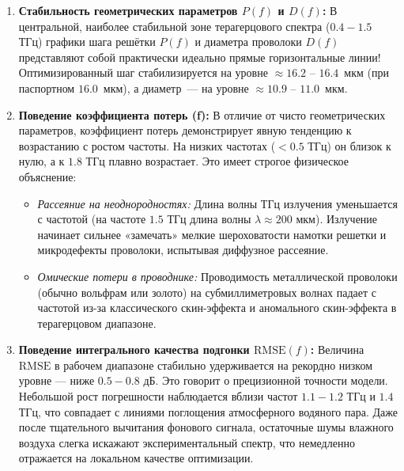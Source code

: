 \begin{enumerate}
    \item \textbf{Стабильность геометрических параметров $P(f)$ и $D(f)$:}
    В центральной, наиболее стабильной зоне терагерцового спектра ($0.4 - 1.5$ ТГц) графики шага решётки $P(f)$ и диаметра проволоки $D(f)$ представляют собой практически идеально прямые горизонтальные линии! Оптимизированный шаг стабилизируется на уровне $\approx 16.2$ -- $16.4$~мкм (при паспортном $16.0$~мкм), а диаметр~--- на уровне $\approx 10.9$ -- $11.0$~мкм. 
    
    
    \item \textbf{Поведение коэффициента потерь (f):}
    В отличие от чисто геометрических параметров, коэффициент потерь демонстрирует явную тенденцию к возрастанию с ростом частоты. На низких частотах ($< 0.5$ ТГц) он близок к нулю, а к $1.8$ ТГц плавно возрастает. Это имеет строгое физическое объяснение:
    \begin{itemize}
        \item \textit{Рассеяние на неоднородностях:} Длина волны ТГц излучения уменьшается с частотой (на частоте $1.5$ ТГц длина волны $\lambda \approx 200$ мкм). Излучение начинает сильнее «замечать» мелкие шероховатости намотки решетки и микродефекты проволоки, испытывая диффузное рассеяние.
        \item \textit{Омические потери в проводнике:} Проводимость металлической проволоки (обычно вольфрам или золото) на субмиллиметровых волнах падает с частотой из-за классического скин-эффекта и аномального скин-эффекта в терагерцовом диапазоне.
    \end{itemize}
    
    \item \textbf{Поведение интегрального качества подгонки $\text{RMSE}(f)$:}
    Величина $\text{RMSE}$ в рабочем диапазоне стабильно удерживается на рекордно низком уровне — ниже $0.5 - 0.8$ дБ. Это говорит о прецизионной точности модели. Небольшой рост погрешности наблюдается вблизи частот $1.1 - 1.2$ ТГц и $1.4$ ТГц, что совпадает с линиями поглощения атмосферного водяного пара. Даже после тщательного вычитания фонового сигнала, остаточные шумы влажного воздуха слегка искажают экспериментальный спектр, что немедленно отражается на локальном качестве оптимизации.
\end{enumerate}

